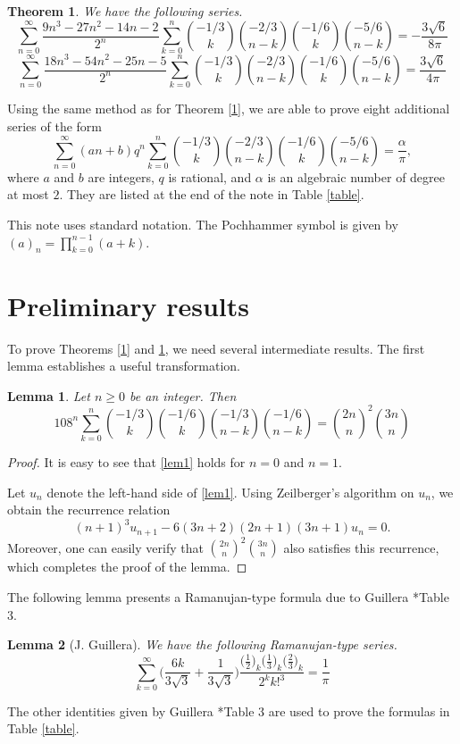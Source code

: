 \documentclass{amsart}
\numberwithin{equation}{section}
\newtheorem{theorem}{Theorem}
\newtheorem{lemma}{Lemma}
\begin{document}
\begin{theorem}
We have the following series.
\begin{equation}
\sum_{n=0}^\infty \frac{9n^3-27n^2-14n-2}{2^n}\sum_{k=0}^n\binom{-1/3}{k}\binom{-2/3}{n-k}\binom{-1/6}{k}\binom{-5/6}{n-k}=-\frac{3\sqrt6}{8\pi}
\label{th2}
\end{equation}
\begin{equation}
\sum_{n=0}^\infty \frac{18n^3-54n^2-25n-5}{2^n}\sum_{k=0}^n\binom{-1/3}{k}\binom{-2/3}{n-k}\binom{-1/6}{k}\binom{-5/6}{n-k}=\frac{3\sqrt6}{4\pi}
\label{th2.2}
\end{equation}
\label{2}
\end{theorem}

Using the same method as for Theorem \ref{1}, we are able to prove eight additional series of the form
\begin{equation}
\sum_{n=0}^\infty (an+b)q^n\sum_{k=0}^n\binom{-1/3}{k}\binom{-2/3}{n-k}\binom{-1/6}{k}\binom{-5/6}{n-k}=\frac{\alpha}{\pi},
\label{general form}
\end{equation}
where $a$ and $b$ are integers, $q$ is rational, and $\alpha$ is an algebraic number of degree at most $2$. They are listed at the end of the note in Table \ref{table}.

This note uses standard notation. The Pochhammer symbol is given by $(a)_n=\prod_{k=0}^{n-1}(a+k)$.
\section{Preliminary results}
To prove Theorems \ref{1} and \ref{2}, we need several intermediate results. The first lemma establishes a useful transformation.
\begin{lemma}
    Let $n\ge0$ be an integer. Then
    \begin{equation}
    108^n\sum_{k=0}^n\binom{-1/3}{k}\binom{-1/6}{k}\binom{-1/3}{n-k}\binom{-1/6}{n-k}=\binom{2n}{n}^2\binom{3n}{n}
    \label{lem1}
    \end{equation}
\end{lemma}
\begin{proof}
    It is easy to see that \eqref{lem1} holds for $n=0$ and $n=1$.
    
Let $u_n$ denote the left-hand side of \eqref{lem1}. Using Zeilberger's algorithm on $u_n$, we obtain the recurrence relation
\[
(n+1)^3 u_{n+1} - 6(3n+2)(2n+1)(3n+1) u_n = 0.
\]
Moreover, one can easily verify that $\binom{2n}{n}^2 \binom{3n}{n}$ also satisfies this recurrence, which completes the proof of the lemma.
\end{proof}
The following lemma presents a Ramanujan-type formula due to Guillera \cite{guillera}*{Table 3}.
\begin{lemma}[J. Guillera]
We have the following Ramanujan-type series.
    \begin{equation}
\sum_{k=0}^\infty\biggl(\frac{6k}{3\sqrt3}+\frac1{3\sqrt{3}}\biggr)\frac{\bigl(\frac{1}{2}\bigr)_k\bigl(\frac{1}{3}\bigr)_k\bigl(\frac{2}{3}\bigr)_k}{2^kk!^3}=\frac{1}{\pi}
    \label{ramanujan}
    \end{equation}
\end{lemma}
The other identities given by Guillera \cite{guillera}*{Table 3} are used to prove the formulas in Table \ref{table}.
\end{document}
